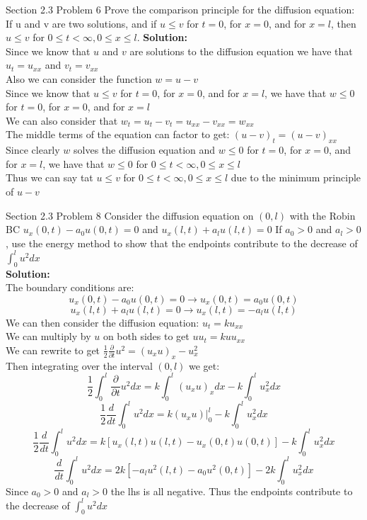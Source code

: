 \documentclass[answers,12pt,addpoints]{exam}
\begin{document}
\begin{questions}
\question Section 2.3 Problem 6
Prove the comparison principle for the diffusion equation: If u and v are two
solutions, and if $u \leq v$ for $t = 0$, for $x = 0$, and for $x = l$, then $u \leq v$ for $0 \leq t <\infty, 0 \leq  x\leq  l$.
\textbf{Solution:}\\
Since we know that $u$ and $v$ are solutions to the diffusion equation we have that $u_t = u_{xx}$ and $v_t = v_{xx}$\\
Also we can consider the function $w = u - v$\\
Since we know that $u \leq v$ for $t = 0$, for $x = 0$, and for $x = l$, we have that $w \leq 0$ for $t = 0$, for $x = 0$, and for $x = l$\\
We can also consider that $w_t = u_t - v_t = u_{xx} - v_{xx} = w_{xx}$\\
The middle terms of the equation can factor to get: $(u-v)_t = (u-v)_{xx}$\\
Since clearly $w$ solves the diffusion equation and $w \leq 0$ for $t = 0$, for $x = 0$, and for $x = l$, we have that $w \leq 0$ for $0 \leq t <\infty, 0 \leq  x\leq  l$\\
Thus we can say tat $u \leq v$ for $0 \leq t <\infty, 0 \leq  x\leq  l$ due to the minimum principle of $u - v$

\question Section 2.3 Problem 8
Consider the diffusion equation on $(0,l)$ with the Robin BC $u_x(0,t) - a_0 u(0,t) = 0$ and $u_x(l,t)+a_lu(l,t) = 0$ If $a_0 > 0$ and $a_l > 0$, use the energy method to show that the endpoints contribute to the decrease of $\int_0^l u^2 dx$\\
\textbf{Solution:}\\
The boundary conditions are: 
$$u_x(0,t) - a_0 u(0,t) = 0 \to u_x(0,t) = a_0 u(0,t)$$
$$u_x(l,t) + a_l u(l,t) = 0 \to u_x(l,t) = -a_l u(l,t)$$
We can then consider the diffusion equation: $u_t = ku_{xx}$\\ 
We can multiply by $u$ on both sides to get $u u_t = ku u_{xx}$\\
We can rewrite to get $\frac{1}{2} \frac{\partial}{\partial t} u^2 = (u_x u )_x - u_x^2$\\
Then integrating over the interval $(0,l)$ we get:
$$ \frac{1}{2} \int_0^l \frac{\partial}{\partial t} u^2 dx = k\int_0^l (u_x u )_x dx - k\int_0^l u_x^2 dx$$
$$ \frac{1}{2} \frac{d}{dt} \int_0^l u^2 dx = k(u_x u )|_0^l - k\int_0^l u_x^2 dx$$
$$\frac{1}{2} \frac{d}{dt} \int_0^l u^2 dx = k[u_x(l,t)u(l,t) - u_x(0,t)u(0,t)] - k\int_0^l u_x^2 dx$$
$$\frac{d}{dt} \int_0^l u^2 dx = 2k[-a_l u^2(l,t) - a_0 u^2(0,t)] - 2k\int_0^l u_x^2 dx$$
Since $a_0 > 0$ and $a_l > 0$ the lhs is all negative. Thus the endpoints contribute to the decrease of $\int_0^l u^2 dx$


\end{questions}
\end{document}

